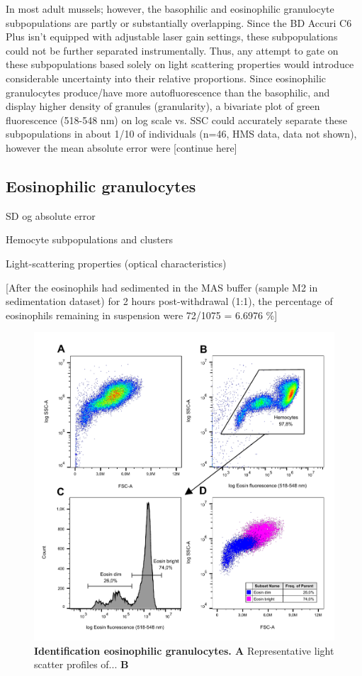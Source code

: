 In most adult mussels; however, the basophilic and eosinophilic granulocyte subpopulations are partly or substantially overlapping. Since the BD Accuri C6 Plus isn't equipped with adjustable laser gain settings, these subpopulations could not be further separated instrumentally. Thus, any attempt to gate on these subpopulations based solely on light scattering properties would introduce considerable uncertainty into their relative proportions. Since eosinophilic granulocytes produce/have more autofluorescence than the basophilic, and display higher density of granules (granularity), a bivariate plot of green fluorescence (518-548 nm) on log scale vs. SSC could accurately separate these subpopulations in about 1/10 of individuals (n=46, HMS data, data not shown), however the mean absolute error were [continue here]



\subsection{Eosinophilic granulocytes}


SD og absolute error

Hemocyte subpopulations and clusters

Light-scattering properties (optical characteristics)

[After the eosinophils had sedimented in the MAS buffer (sample M2 in sedimentation dataset) for 2 hours post-withdrawal (1:1), the percentage of eosinophils remaining in suspension were 72/1075 = 6.6976 \%]

\begin{figure}[!ht]
    \centering
    \includegraphics[width=1.0\textwidth]{figures/Eosin and Percoll exp/Pool II 0.75 per m.pdf}
    \caption{\textbf{Identification eosinophilic granulocytes. A} Representative light scatter profiles of... \textbf{B} }
    \label{fig:eosin_exp2}
\end{figure}

